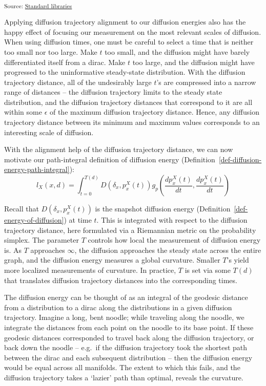 \documentclass[
  letterpaper,
  DIV=11,
  numbers=noendperiod]{scrartcl}
\theoremstyle{plain}
\theoremstyle{plain}
\theoremstyle{definition}
\theoremstyle{plain}
\theoremstyle{definition}
\theoremstyle{plain}
\theoremstyle{remark}
\begin{document}
\textsubscript{Source:
\href{https://professorwug.github.io/diffusion-curvature//Users/boreas/Pumberton/Workshop/21-SUMRY-Curvature/diffusion-curvature/nbs/3d-diffusion-trajectory-distance-normalization.ipynb.html\#cell-fig-curvature-curves}{Standard
libraries}}

Applying diffusion trajectory alignment to our diffusion energies also
has the happy effect of focusing our measurement on the most relevant
scales of diffusion. When using diffusion times, one must be careful to
select a time that is neither too small nor too large. Make \(t\) too
small, and the diffusion might have barely differentiated itself from a
dirac. Make \(t\) too large, and the diffusion might have progressed to
the uninformative steady-state distribution. With the diffusion
trajectory distance, all of the undesirably large \(t\)'s are compressed
into a narrow range of distances -- the diffusion trajectory limits to
the steady state distribution, and the diffusion trajectory distances
that correspond to it are all within some \(\epsilon\) of the maximum
diffusion trajectory distance. Hence, any diffusion trajectory distance
between its minimum and maximum values corresponds to an interesting
scale of diffusion.

With the alignment help of the diffusion trajectory distance, we can now
motivate our path-integral definition of diffusion energy
(Definition~\ref{def-diffusion-energy-path-integral}): \[
l_{X}(x, d)= \int_{t=0}^{T(d)} D\left(\delta_x, p_x^X(t)\right) g_p\left(\frac{d p_x^X(t)}{d t}, \frac{ d p_x^X(t) }{d t} \right)
\]

Recall that \(D(\delta_{x}, p_{x}^X(t))\) is the snapshot diffusion
energy (Definition~\ref{def-energy-of-diffusion}) at time \(t\). This is
integrated with respect to the diffusion trajectory distance, here
formulated via a Riemannian metric on the probability simplex. The
parameter \(T\) controls how local the measurement of diffusion energy
is. As \(T\) approaches \(\infty\), the diffusion approaches the steady
state across the entire graph, and the diffusion energy measures a
global curvature. Smaller \(T\)'s yield more localized measurements of
curvature. In practice, \(T\) is set via some \(T(d)\) that translates
diffusion trajectory distances into the corresponding times.

The diffusion energy can be thought of as an integral of the geodesic
distance from a distribution to a dirac along the distributions in a
given diffusion trajectory. Imagine a long, bent noodle; while traveling
along the noodle, we integrate the distances from each point on the
noodle to its base point. If these geodesic distances corresponded to
travel back along the diffusion trajectory, or back down the noodle --
e.g.~if the diffusion trajectory took the shortest path between the
dirac and each subsequent distribution -- then the diffusion energy
would be equal across all manifolds. The extent to which this fails, and
the diffusion trajectory takes a `lazier' path than optimal, reveals the
curvature.
\end{document}
